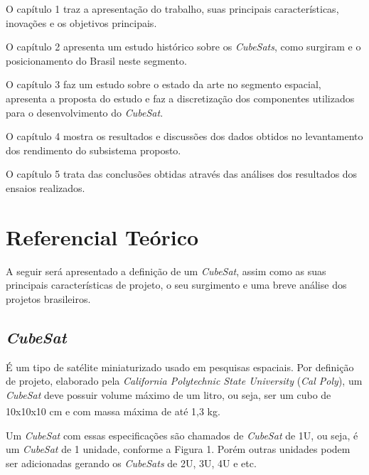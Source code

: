 \documentclass[
	12pt,				%
	openright,			%
	oneside,			%
	a4paper,			%
	english,			%
	french,				%
	spanish,			%
	brazil,				%
	oldfontcommands
	]{abntex2}
\begin{document}
	O capítulo 1 traz a apresentação do trabalho, suas principais características, inovações e os objetivos principais.

	O capítulo 2 apresenta um estudo histórico sobre os \textit{CubeSats}, como surgiram e o posicionamento do Brasil neste segmento. 

	O capítulo 3 faz um estudo sobre o estado da arte no segmento espacial, apresenta a proposta do estudo e faz a discretização dos componentes utilizados para o desenvolvimento do \textit{CubeSat}.

	O capítulo 4 mostra os resultados e discussões dos dados obtidos no levantamento dos rendimento do subsistema proposto.

	O capítulo 5 trata das conclusões obtidas através das análises dos resultados dos ensaios realizados. 

\chapter[Referencial Teórico]{Referencial Teórico}

	A seguir será apresentado a definição de um \textit{CubeSat}, assim como as suas principais características de projeto, o seu surgimento e uma breve análise dos projetos brasileiros. 

\section[CubeSat]{\textit{CubeSat}}

	É um tipo de satélite miniaturizado usado em pesquisas espaciais. Por definição de projeto, elaborado pela \textit{California Polytechnic State University} (\textit{Cal Poly}), um \textit{CubeSat} deve possuir volume máximo de um litro, ou seja, ser um cubo de 10x10x10 cm e com massa máxima de até 1,3 kg.\textsuperscript{\cite{CubeSat}}
	
	Um \textit{CubeSat} com essas especificações são chamados de \textit{CubeSat} de 1U, ou seja, é um \textit{CubeSat} de 1 unidade, conforme a Figura 1. Porém outras unidades podem ser adicionadas gerando os \textit{CubeSats} de 2U, 3U, 4U e etc.
	
\end{document}

